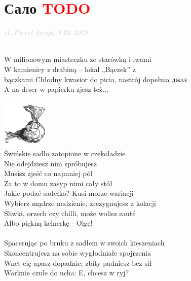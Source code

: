 \documentclass[a5paper, 10pt]{book}
\begin{document}
\section{\foreignlanguage{russian}{Сало} \textcolor{red}{TODO}}\textcolor{lightgray}{\textit{sł. Paweł Jacyk, VIII 2019}}\\~\\
\begin{minipage}[t]{0.8\textwidth}
W milionowym miasteczku ze starówką i lwami	\\
W kamienicy z drabiną – lokal „Bączek” z \\bączkami		
Chłodny kwasior do picia, nastrój dopełnia \foreignlanguage{russian}{джaз}\\
A na deser w papierku zjesz też...\\
\\
\hspace*{6.5cm}\includegraphics[height=2.2cm]{images/salo.png}\vspace*{-2.21cm}\\
\hspace*{5mm}Świńskie sadło zatopione w czekoladzie	\\
\hspace*{5mm}Nie odejdziesz nim spróbujesz			\\
\hspace*{5mm}Musisz zjeść co najmniej pół			\\
\hspace*{5mm}Za to w domu zasyp nimi cały stół		\\	

Jakie podać sadełko? Kusi morze wariacji\\
Wybierz mądrze nadzienie, zrezygnujesz z kolacji\\
Śliwki, orzech czy chilli, może wolisz sauté\\
Albo piękną kelnerkę - Olgę!\\
\\
Spacerując po bruku z sadłem w swoich kieszeniach\\
Skoncentrujesz na sobie wygłodniałe spojrzenia\\
Wnet cię apasz dopadnie; zbity padniesz bez sił\\
Warknie czule do ucha: E, chcesz w ryj?\\
\end{minipage}
\end{document}
